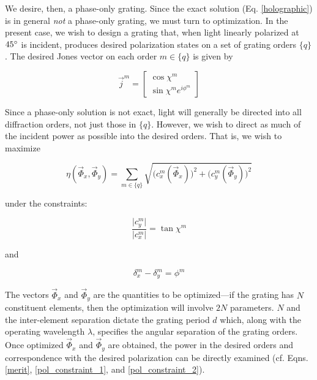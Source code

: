 \documentclass[footinbib,aps,prl,twocolumn,superscriptaddress]{revtex4-1}
\begin{document}
We desire, then, a phase-only grating. Since the exact solution (Eq. \ref{holographic}) is in general \textit{not} a phase-only grating, we must turn to optimization. In the present case, we wish to design a grating that, when light linearly polarized at $45\degree$ is incident, produces desired polarization states on a set of grating orders $\{q\}$. The desired Jones vector on each order $m \in \{q\}$ is given by

\begin{equation}
	\vec{j}^m = 
	\begin{bmatrix}
	\cos\chi^m \\ \sin\chi^m e^{i\phi^m}
	\end{bmatrix}
\end{equation}

Since a phase-only solution is not exact, light will generally be directed into all diffraction orders, not just those in $\{q\}$. However, we wish to direct as much of the incident power as possible into the desired orders. That is, we wish to maximize

\begin{equation}
	\label{merit}
	\eta(\vec{\Phi}_x, \vec{\Phi}_y) = \sum_{m \in \{q\}} \sqrt{\Big(c_x^m(\vec{\Phi}_x)\Big)^2 + \Big(c_y^m(\vec{\Phi}_y)\Big)^2}
\end{equation}

under the constraints:

\begin{equation}
	\label{pol_constraint_1}
	\frac{\lvert c_y^m \rvert}{\lvert c_x^m \rvert} = \tan \chi^m
\end{equation}

and

\begin{equation}
	\label{pol_constraint_2}
	\delta_x^m - \delta_y^m = \phi^m
\end{equation}

The vectors $\vec{\Phi}_x$ and $\vec{\Phi}_y$ are the quantities to be optimized---if the grating has $N$ constituent elements, then the optimization will involve $2N$ parameters. $N$ and the inter-element separation dictate the grating period $d$ which, along with the operating wavelength $\lambda$, specifies the angular separation of the grating orders. Once optimized $\vec{\Phi}_x$ and $\vec{\Phi}_y$ are obtained, the power in the desired orders and correspondence with the desired polarization can be directly examined (cf. Eqns. \ref{merit}, \ref{pol_constraint_1}, and \ref{pol_constraint_2}).
\end{document}
